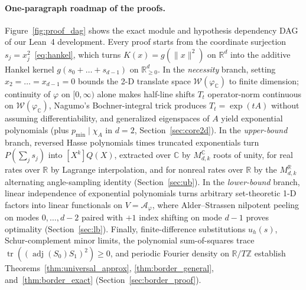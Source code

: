 \documentclass[11pt,a4paper]{article}
\theoremstyle{plain}
\theoremstyle{definition}
\newcommand{\R}{\mathbb{R}}
\newcommand{\C}{\mathbb{C}}
\newcommand{\Rnn}{\mathbb{R}_{\ge 0}}
\begin{document}
\paragraph{One-paragraph roadmap of the proofs.}
Figure~\ref{fig:proof_dag} shows the exact module and hypothesis dependency DAG of our Lean~4 development. Every proof starts from the coordinate surjection $s_j = x_j^2$~\eqref{eq:hankel}, which turns $K(x) = g(\|x\|^2)$ on $\R^d$ into the additive Hankel kernel $g(s_0 + \dots + s_{d-1})$ on $\Rnn^d$. In the \emph{necessity} branch, setting $x_2 = \dots = x_{d-1} = 0$ bounds the 2-D translate space $\mathcal{W}(\varphi_{\C})$ to finite dimension; continuity of $\varphi$ on $[0,\infty)$ alone makes half-line shifts $T_t$ operator-norm continuous on $\mathcal{W}(\varphi_{\C})$, Nagumo's Bochner-integral trick produces $T_t = \exp(tA)$ without assuming differentiability, and generalized eigenspaces of $A$ yield exponential polynomials (plus $p_{\min} \mid \chi_A$ in $d = 2$, Section~\ref{sec:core2d}). In the \emph{upper-bound} branch, reversed Hasse polynomials times truncated exponentials turn $P(\sum_j s_j)$ into $[X^k]Q(X)$, extracted over $\C$ by $M_{d,k}^{\C}$ roots of unity, for real rates over $\R$ by Lagrange interpolation, and for nonreal rates over $\R$ by the $M_{d,k}^{\R}$ alternating angle-sampling identity (Section~\ref{sec:ub}). In the \emph{lower-bound} branch, linear independence of exponential polynomials turns arbitrary set-theoretic 1-D factors into linear functionals on $V = \mathcal{A}_\varphi$, where Alder--Strassen nilpotent peeling on modes $0,\dots,d-2$ paired with $+1$ index shifting on mode $d - 1$ proves optimality (Section~\ref{sec:lb}). Finally, finite-difference substitutions $u_h(s)$, Schur-complement minor limits, the polynomial sum-of-squares trace $\operatorname{tr}((\operatorname{adj}(S_0)S_1)^2) \ge 0$, and periodic Fourier density on $\R/T\mathbb{Z}$ establish Theorems~\ref{thm:universal_approx}, \ref{thm:border_general}, and~\ref{thm:border_exact} (Section~\ref{sec:border_proof}).
\end{document}
